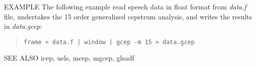 \begin{qsection}{EXAMPLE}
The following example read speech data in float format from {\em data.f}
file, undertakes the 15 order generalized cepstrum analysis,
and writes the results in {\em data.gcep}:
\begin{quote}
 \verb!frame < data.f | window | gcep -m 15 > data.gcep!
\end{quote} 
\end{qsection}

\begin{qsection}{SEE ALSO}
icep, uels, mcep, mgcep, glsadf
\end{qsection}
